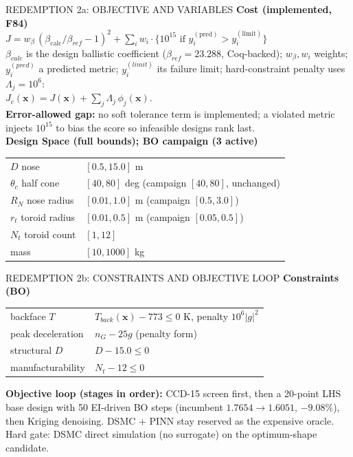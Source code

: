 \documentclass[aspectratio=169,11pt]{beamer}
\begin{document}
\begin{frame}{REDEMPTION 2a: OBJECTIVE AND VARIABLES}
  \small
  \textbf{Cost (implemented, F84)}\\
  $J = w_\beta\,(\beta_{\mathrm{calc}}/\beta_{ref}-1)^2 +
  \sum_i w_i\cdot\{10^{15}\text{ if }y_i^{(\mathrm{pred})} > y_i^{(\mathrm{limit})}\}$\\
  $\beta_{calc}$ is the design ballistic coefficient ($\beta_{ref}=23.288$, Coq-backed);
  $w_\beta,w_i$ weights; $y_i^{(pred)}$ a predicted metric;
  $y_i^{(limit)}$ its failure limit; hard-constraint penalty uses $\Lambda_j=10^6$:\\
  $J_c(\mathbf{x}) = J(\mathbf{x}) + \sum_j \Lambda_j\,\phi_j(\mathbf{x})$.\\
  \vspace{0.1cm}
  \textbf{Error-allowed gap:} no soft tolerance term is implemented; a violated
  metric injects $10^{15}$ to bias the score so infeasible designs rank last.\\
  \textbf{Design Space (full bounds); BO campaign (3 active)}\\
  \begin{tabular}{@{}ll@{}}
  \hline
  $D$ nose & $[0.5,15.0]$ m\\
  $\theta_c$ half cone & $[40,80]$ deg (campaign $[40,80]$, unchanged)\\
  $R_N$ nose radius & $[0.01,1.0]$ m (campaign $[0.5,3.0]$)\\
  $r_t$ toroid radius & $[0.01,0.5]$ m (campaign $[0.05,0.5]$)\\
  $N_t$ toroid count & $[1,12]$\\
  mass & $[10,1000]$ kg\\
  \hline
  \end{tabular}
\end{frame}
\begin{frame}{REDEMPTION 2b: CONSTRAINTS AND OBJECTIVE LOOP}
  \small
  \textbf{Constraints (BO)}\
  \begin{tabular}{@{}p{3.3cm}p{4.8cm}@{}}
  backface $T$ & $T_{back}(\mathbf{x})-773\le 0$ K, penalty $10^6 |g|^2$\\
  peak deceleration & $n_G-25g$ (penalty form)\\
  structural $D$ & $D-15.0\le 0$\\
  manufacturability & $N_t-12\le 0$\\
  \end{tabular}
  \vspace{0.2cm}
  \textbf{Objective loop (stages in order):} CCD-15 screen first, then a
  20-point LHS base design with 50 EI-driven BO steps (incumbent
  $1.7654\to1.6051$, $-9.08\%$), then Kriging denoising. DSMC + PINN stay
  reserved as the expensive oracle. Hard gate: DSMC direct simulation
  (no surrogate) on the optimum-shape candidate.
\end{frame}
\end{document}

